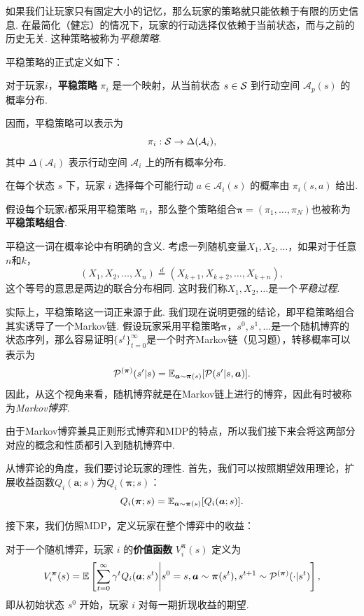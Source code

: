 如果我们让玩家只有固定大小的记忆，那么玩家的策略就只能依赖于有限的历史信息. 在最简化（健忘）的情况下，玩家的行动选择仅依赖于当前状态，而与之前的历史无关. 这种策略被称为\textit{平稳策略}.

平稳策略的正式定义如下：

\begin{definition}[平稳策略]
    对于玩家$i$，\textbf{平稳策略} $\pi_i$ 是一个映射，从当前状态 $s \in \mathcal S$ 到行动空间 $\mathcal{A}_p(s)$ 的概率分布. 
    
    因而，平稳策略可以表示为 
    \[\pi_i : \mathcal S \rightarrow \Delta(\mathcal{A}_i),\]
    其中 $\Delta(\mathcal{A}_i)$ 表示行动空间 $\mathcal{A}_i$ 上的所有概率分布. 
    
    在每个状态 $s$ 下，玩家 $i$ 选择每个可能行动 $a \in \mathcal{A}_i(s)$ 的概率由 $\pi_i(s,a)$ 给出. 
    
    假设每个玩家$i$都采用平稳策略 $\pi_i$，那么整个策略组合$\boldsymbol \pi=(\pi_1,\dots, \pi_N)$也被称为\textbf{平稳策略组合}.
\end{definition}

平稳这一词在概率论中有明确的含义. 考虑一列随机变量$X_1,X_2,\dots$，如果对于任意$n$和$k$，
\[(X_1,X_2,\dots,X_n)\stackrel{d}{=} (X_{k+1},X_{k+2},\dots,X_{k+n}),\]
这个等号的意思是两边的联合分布相同. 这时我们称$X_1,X_2,\dots$是一个\textit{平稳过程}.

实际上，平稳策略这一词正来源于此. 我们现在说明更强的结论，即平稳策略组合其实诱导了一个Markov链. 假设玩家采用平稳策略$\boldsymbol \pi$，$s^0,s^1,\dots$是一个随机博弈的状态序列，那么容易证明$\{s^t\}_{t=0}^{\infty}$是一个时齐Markov链（见习题），转移概率可以表示为
\[\mathcal P^{(\boldsymbol \pi)}(s'|s)=\mathbb{E}_{\boldsymbol a\sim \boldsymbol \pi(s)}[\mathcal P(s'|s,\boldsymbol a)].\]
因此，从这个视角来看，随机博弈就是在Markov链上进行的博弈，因此有时被称为\textit{Markov博弈}.

由于Markov博弈兼具正则形式博弈和MDP的特点，所以我们接下来会将这两部分对应的概念和性质都引入到随机博弈中.

从博弈论的角度，我们要讨论玩家的理性. 首先，我们可以按照期望效用理论，扩展收益函数$Q_i(\boldsymbol a;s)$为$Q_i(\boldsymbol \pi;s)$：
\[Q_i(\boldsymbol \pi;s)=\mathbb{E}_{\boldsymbol a\sim \boldsymbol \pi(s)}[Q_i(\boldsymbol a;s)].\]

接下来，我们仿照MDP，定义玩家在整个博弈中的收益：

\begin{definition}[价值函数]
    对于一个随机博弈，玩家 $i$ 的\textbf{价值函数} $V_i^{\boldsymbol \pi}(s)$ 定义为
    \[V_i^{\boldsymbol \pi}(s) = \mathbb{E}\left[\sum_{t=0}^{\infty} \gamma^t Q_i(\boldsymbol a; s^t)\middle| s^0=s, \boldsymbol a\sim \boldsymbol \pi(s^t), s^{t+1}\sim \mathcal P^{(\boldsymbol \pi)}(\cdot|s^t)\right],\]
    即从初始状态 $s^0$ 开始，玩家 $i$ 对每一期折现收益的期望.
\end{definition}

